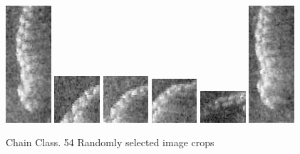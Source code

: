 \begin{figure}
    \includegraphics[width=0.15\textwidth]{chapters/images/dataset/all-class-images/chain/chain-39.jpg}
    \includegraphics[width=0.15\textwidth]{chapters/images/dataset/all-class-images/chain/chain-95.jpg}
    \includegraphics[width=0.15\textwidth]{chapters/images/dataset/all-class-images/chain/chain-85.jpg}    
    \includegraphics[width=0.15\textwidth]{chapters/images/dataset/all-class-images/chain/chain-140.jpg}
    \includegraphics[width=0.15\textwidth]{chapters/images/dataset/all-class-images/chain/chain-192.jpg}    
    \includegraphics[width=0.15\textwidth]{chapters/images/dataset/all-class-images/chain/chain-44.jpg}
    
    \caption{Chain Class. 54 Randomly selected image crops}
    \label{appendix:chain}    
\end{figure}

